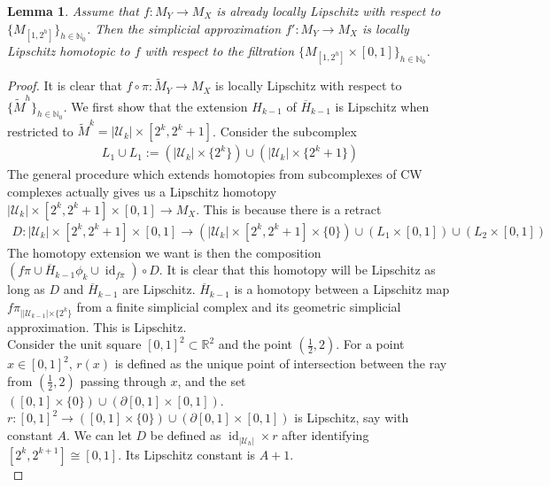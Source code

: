 \documentclass[a4paper,11pt]{article}
\theoremstyle{definition}
\theoremstyle{plain}
\newtheorem{lemma}[definition]{Lemma}
\theoremstyle{remark}
\DeclareMathOperator{\id}{id}
\begin{document}
{\begin{lemma} \label{alreadyll} Assume that $f: M_{Y}\rightarrow M_{X}$ is already locally Lipschitz with respect to $\{M_{[1,2^h]}\}_{h\in \mathbb{N}_{0}}$. Then the simplicial approximation $f': M_{Y}\rightarrow M_{X}$ is locally Lipschitz homotopic to $f$ with respect to the filtration $\{M_{[1,2^h]} \times [0,1]\}_{h\in \mathbb{N}_{0}}$. 
\end{lemma}
\begin{proof} It is clear that $f\circ \pi: \tilde{M}_{Y}\rightarrow M_{X}$ is locally Lipschitz with respect to $\{\tilde{M}^{h}\}_{h\in \mathbb{N}_0}$. We first show that the extension $H_{k-1}$ of $\overline{H}_{k-1}$ is Lipschitz when restricted to $\tilde{M}^{k}=|\mathcal{U}_{k}| \times [2^{k}, 2^{k} +1]$. Consider the subcomplex 
\begin{align*}
L_1\cup L_{1}:=(|\mathcal{U}_{k}| \times \{2^k\}) \cup (|\mathcal{U}_{k}| \times \{2^{k}+1\})
\end{align*}
The general procedure which extends homotopies from subcomplexes of CW complexes actually gives us a Lipschitz homotopy $|\mathcal{U}_{k}| \times [2^k, 2^{k}+1] \times [0,1]\rightarrow M_{X}$. This is because there is a retract
\begin{align*}
D: |\mathcal{U}_{k}| \times [2^k, 2^{k}+1] \times [0,1] 
\rightarrow (|\mathcal{U}_{k}| \times [2^k,2^{k}+1] \times \{0\}) \cup (L_1\times [0,1])\cup  (L_2\times [0,1])
\end{align*}
The homotopy extension we want is then the composition $(f\pi \cup \overline{H}_{k-1}\phi_{k} \cup \id_{f\pi})\circ D$. It is clear that this homotopy will be Lipschitz as long as $D$ and $\overline{H}_{k-1}$ are Lipschitz. $\overline{H}_{k-1}$ is a homotopy between a Lipschitz map $f\pi_{||\mathcal{U}_{k-1}| \times \{2^{k}\}}$ from a finite simplicial complex and its geometric simplicial approximation. This is Lipschitz.\\

Consider the unit square $[0,1]^2 \subset \mathbb{R}^2$ and the point $(\frac{1}{2},2)$. For a point $x\in [0,1]^2$, $r(x)$ is defined as the unique point of intersection between the ray from $(\frac{1}{2},2)$ passing through $x$, and the set $([0,1] \times \{0\}) \cup (\partial[0,1] \times [0,1])$. $r:[0,1]^2 \rightarrow ([0,1] \times \{0\}) \cup (\partial[0,1] \times [0,1])$ is Lipschitz, say with constant $A$. We can let $D$ be defined as  $\id_{|\mathcal{U}_{h}|} \times r$ after identifying $[2^{k},2^{k+1}]\cong [0,1]$. Its Lipschitz constant is $A+1$. \\


\end{proof}}
\end{document}
